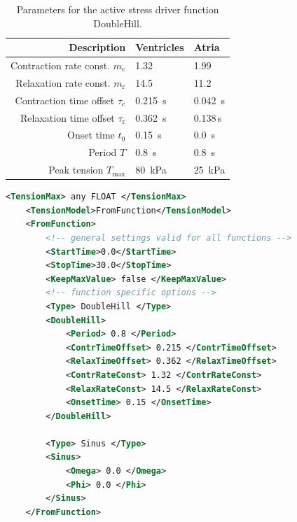\begin{itemize}
\begin{table}[htb]
    \caption{Parameters for the active stress driver function DoubleHill.}
    \label{tab:DH}
    \centering
    \vspace{10pt}
    \begin{tabular}{rll}
    \hline
    Description & Ventricles & Atria  \\
    \hline
    Contraction rate const. $m_\text{c}$		& \num{1.32}	& \num{1.99} \\
    Relaxation rate const. $m_\text{r}$		& \num{14.5}	& \num{11.2} \\
    Contraction time offset $\tau_\text{c}$	& \SI{0.215}{\second} & \SI{0.042}{\second} \\
    Relaxation time offset $\tau_\text{r}$	& \SI{0.362}{\second} & 0.138\,s \\
    Onset time $t_0$					& \SI{0.15}{\second}	& \SI{0.0}{\second} \\
    Period $T$							& \SI{0.8}{\second}	& \SI{0.8}{\second} \\
    Peak tension $T_\text{max}$ & \SI{80}{kPa} & \SI{25}{kPa} \\
    \hline
    \end{tabular}
\end{table}
\end{itemize}

\begin{lstlisting}[language=XML,caption=.xml settings for the FromFunction tension models]
    <TensionMax> any FLOAT </TensionMax>
    <TensionModel>FromFunction</TensionModel>
    <FromFunction>
        <!-- general settings valid for all functions -->
        <StartTime>0.0</StartTime>
        <StopTime>30.0</StopTime>
        <KeepMaxValue> false </KeepMaxValue>
        <!-- function specific options -->
        <Type> DoubleHill </Type>
        <DoubleHill>
            <Period> 0.8 </Period>
            <ContrTimeOffset> 0.215 </ContrTimeOffset>
            <RelaxTimeOffset> 0.362 </RelaxTimeOffset>
            <ContrRateConst> 1.32 </ContrRateConst>
            <RelaxRateConst> 14.5 </RelaxRateConst>
            <OnsetTime> 0.15 </OnsetTime>
        </DoubleHill>

        <Type> Sinus </Type>
        <Sinus>
            <Omega> 0.0 </Omega>
            <Phi> 0.0 </Phi>
        </Sinus>
    </FromFunction>
\end{lstlisting}

